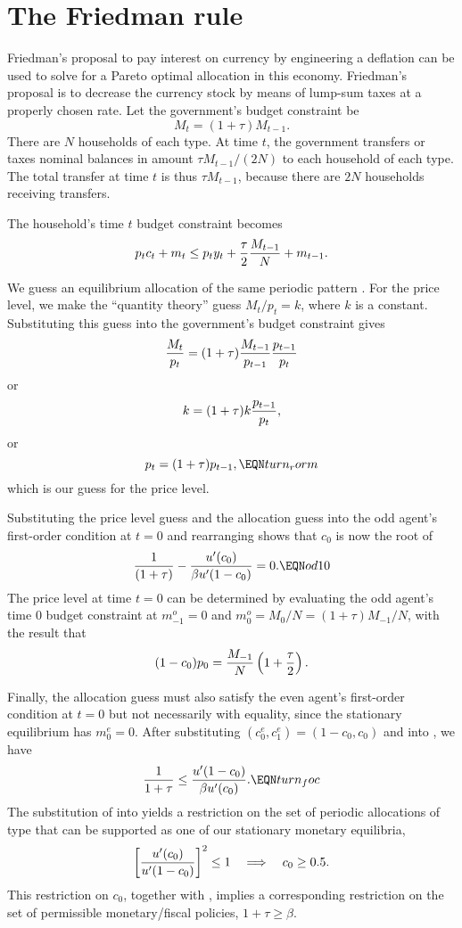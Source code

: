 \section{The Friedman rule}
Friedman's proposal to pay interest on currency by engineering a deflation can
be used to solve for a Pareto optimal allocation in this economy.  Friedman's
proposal is to decrease the currency stock by means of lump-sum taxes at a
properly chosen rate.  Let the government's budget constraint be
$$ M_t = (1 + \tau) M_{t-1} .$$
There are $N$ households of each type.  At time $t$, the government transfers or
taxes nominal balances in amount $\tau M_{t-1} / (2 N)$ to each household of each
type.  The total transfer at time $t$ is thus $\tau M_{t-1}$, because there are
$2 N$ households receiving transfers.

The household's time $t$ budget constraint becomes
$$ p_t c_t + m_t \leq p_t y_t + {\tau \over 2} {M_{t-1} \over N} +m_{t-1}. $$

We guess an equilibrium allocation of the same periodic
pattern .  For the price level, we make
the ``quantity theory'' guess $M_t / p_t = k$,
where $k$ is a constant.  Substituting this guess into
the government's budget constraint gives
$$ { M_t \over p_t} = (1+ \tau) {M_{t-1} \over p_{t-1}}{p_{t-1} \over p_t}$$
or
$$ k = (1 + \tau) k { p_{t-1} \over p_t},$$
or
$$ p_t = (1+\tau) p_{t-1},                                 \EQN turn_rorm
$$
which is our guess for the price level.

Substituting the price level guess and the allocation guess
into the odd agent's first-order condition  at $t=0$ and
rearranging shows that $c_0$ is now the root of
$$ {1 \over (1 + \tau)} - {u'(c_0) \over \beta u'(1-c_0)} = 0 .\EQN od10$$
The price level at time $t=0$ can be determined by evaluating
the odd agent's time $0$ budget constraint at
$m_{-1}^o = 0$ and $m_0^o = M_0/N=(1+\tau)M_{-1}/N$, with the result
that
$$(1 - c_0) p_0 = {M_{-1} \over N} \left(1+ {\tau \over 2}\right) .$$

Finally, the allocation guess must also satisfy the even agent's
first-order condition  at $t=0$ but not necessarily with
equality, since the stationary equilibrium has $m_0^e = 0$.
After substituting $(c_0^e, c_1^e) =(1-c_0, c_0)$ and
 into , we have
$$
{1 \over 1+\tau} \leq {u'(1-c_0) \over \beta u'(c_0)}.     \EQN turn_foc
$$
The substitution of  into  yields a restriction
on the set of periodic allocations of type  that can
be supported as one of our stationary monetary equilibria,
$$
\left[ {u'(c_0) \over u'(1-c_0)} \right]^2 \leq 1 \quad \Longrightarrow
\quad c_0 \geq 0.5.
$$
This restriction on $c_0$, together with , implies a
corresponding restriction on the set of permissible monetary/fiscal
policies, $1+\tau \geq \beta$.

